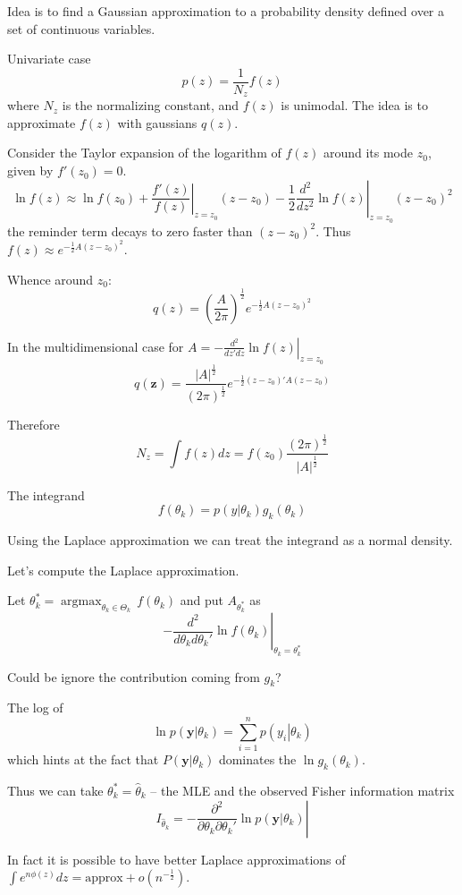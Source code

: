 \documentclass[a4paper]{article}
\newcommand{\brac}[1]{{\left ( #1 \right )}}
\newcommand{\induc}[1]{{\left . #1 \right \vert}}
\newcommand{\abs}[1]{{\left | #1 \right |}}
\newcommand{\argmax}{\mathop{\text{argmax}}}
\begin{document}
Idea is to find a Gaussian approximation to a probability density defined over a set of continuous variables.

Univariate case
\[p(z) = \frac{1}{N_z}f(z)\]
where $N_z$ is the normalizing constant, and $f(z)$ is unimodal.
The idea is to approximate $f(z)$ with gaussians $q(z)$.

Consider the Taylor expansion of the logarithm of $f(z)$ around its mode $z_0$, given by $f'(z_0) = 0$.
\[\ln f(z) \approx \ln f(z_0) + \induc{\frac{f'(z)}{f(z)}}_{z=z_0} (z-z_0) - \frac{1}{2} \induc{\frac{d^2}{dz^2} \ln f(z)}_{z=z_0} \brac{z-z_0}^2 \]
the reminder term decays to zero faster than $\brac{z-z_0}^2$. Thus $f(z)\approx e^{ -\frac{1}{2} A {(z-z_0)}^2 }$.

Whence around $z_0$:
\[q(z) = \brac{\frac{A}{2\pi}}^\frac{1}{2}e^{ -\frac{1}{2} A {(z-z_0)}^2 }\]

In the multidimensional case for $A = \induc{-\frac{d^2}{dz'dz}\ln f(z)}_{z=z_0}$
\[q(\mathbf{z}) = \frac{\abs{A}^\frac{1}{2}}{{(2\pi)}^\frac{1}{2}} e^{-\frac{1}{2} (z-z_0)'A(z-z_0)}\]

Therefore
\[N_z = \int f(z) dz = f(z_0) \frac{{(2\pi)}^\frac{1}{2}}{\abs{A}^\frac{1}{2}}\]


The integrand
\[f(\theta_k) = p\brac{\induc{y}\theta_k}g_k(\theta_k)\]

Using the Laplace approximation we can treat the integrand as a normal density.

Let's compute the Laplace approximation.

Let $\theta_k^* = \argmax_{\theta_k\in \Theta_k}\,f(\theta_k)$ and put $A_{\theta_k^*}$ as
\[\induc{- \frac{d^2}{d\theta_kd\theta_k'} \ln f(\theta_k)}_{\theta_k=\theta_k^*}\]

Could be ignore the contribution coming from $g_k$?

The log of
\[\ln p\brac{\induc{\mathbf{y}}\theta_k} = \sum_{i=1}^n p\brac{\induc{y_i}\theta_k}\]
which hints at the fact that $P\brac{\induc{\mathbf{y}}\theta_k}$ dominates the $\ln g_k(\theta_k)$.

Thus we can take $\theta_k^* = \hat{\theta}_k$ -- the MLE and the observed Fisher information matrix
\[I_{\hat{\theta}_k} = \induc{- \frac{\partial^2}{\partial\theta_k \partial\theta_k'}\ln p\brac{\induc{\mathbf{y}} \theta_k}} \]

In fact it is possible to have better Laplace approximations of $\int e^{n\phi(z)}dz = \text{approx} + o(n^{-\frac{1}{2}})$.
\end{document}
